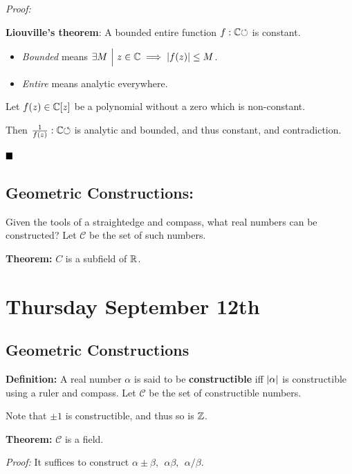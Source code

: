 \emph{Proof:}

\textbf{Liouville's theorem}: A bounded entire function
\(f: {\mathbb{C}} {\circlearrowleft}\) is constant.

\begin{itemize}
\item
  \emph{Bounded} means
  \(\exists M {~\mathrel{\Big|}~} z\in {\mathbb{C}} \implies {\left\lvert {f(z)} \right\rvert} \leq M\).
\item
  \emph{Entire} means analytic everywhere.
\end{itemize}

Let \(f(z) \in {\mathbb{C}}[z]\) be a polynomial without a zero which is
non-constant.

Then \(\frac 1 {f(z)}: {\mathbb{C}} {\circlearrowleft}\) is analytic and bounded, and thus
constant, and contradiction.

\(\qed\)

\hypertarget{geometric-constructions}{%
\subsection{Geometric Constructions:}\label{geometric-constructions}}

Given the tools of a straightedge and compass, what real numbers can be
constructed? Let \(\mathcal C\) be the set of such numbers.

\textbf{Theorem:} \(C\) is a subfield of \({\mathbb{R}}\).

\hypertarget{thursday-september-12th}{%
\section{Thursday September 12th}\label{thursday-september-12th}}

\hypertarget{geometric-constructions}{%
\subsection{Geometric Constructions}\label{geometric-constructions}}

\textbf{Definition:} A real number \(\alpha\) is said to be
\textbf{constructible} iff \({\left\lvert {\alpha} \right\rvert}\) is constructible using a
ruler and compass. Let \(\mathcal C\) be the set of constructible
numbers.

Note that \(\pm 1\) is constructible, and thus so is \({\mathbb{Z}}\).

\textbf{Theorem:} \(\mathcal{C}\) is a field.

\emph{Proof:} It suffices to construct
\(\alpha \pm \beta,~~ \alpha\beta,~~ \alpha / \beta\).

